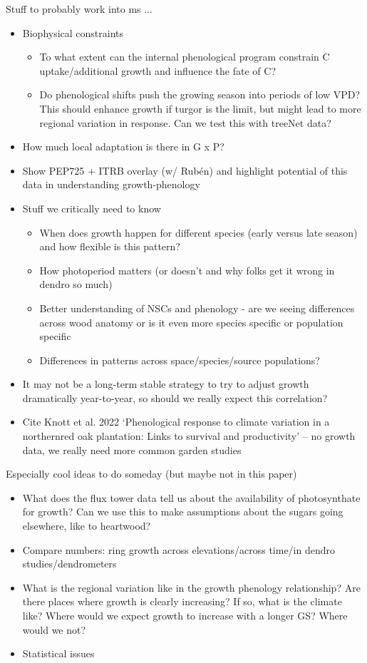 \documentclass[11pt,letter]{article}
\begin{document}
Stuff to probably work into ms ...
\begin{itemize}
\item Biophysical constraints
\begin{itemize}
\item To what extent can the internal phenological program constrain C uptake/additional growth and influence the fate of C?
\item Do phenological shifts push the growing season into periods of low VPD? This should enhance growth if turgor is the limit, but might lead to more regional variation in response. Can we test this with treeNet data?
\end{itemize}
\item How much local adaptation is there in G x P?
\item Show PEP725 + ITRB overlay (w/ Rubén) and highlight potential of this data in understanding growth-phenology
\item Stuff we critically need to know
\begin{itemize}
\item When does growth happen for different species (early versus late season) and how flexible is this pattern?
\item How photoperiod matters (or doesn't and why folks get it wrong in dendro so much)
\item Better understanding of NSCs and phenology - are we seeing differences across wood anatomy or is it even more species specific or population specific
\item Differences in patterns across space/species/source populations?
\end{itemize}
\item It may not be a long-term stable strategy to try to adjust growth dramatically year-to-year, so should we really expect this correlation?
\item Cite Knott et al. 2022 `Phenological response to climate variation in a northernred oak plantation: Links to survival and productivity' -- no growth data, we really need more common garden studies
\end{itemize}

Especially cool ideas to do someday (but maybe not in this paper)
\begin{itemize}
\item What does the flux tower data tell us about the availability of photosynthate for growth? Can we use this to make assumptions about the sugars going elsewhere, like to heartwood?
\item Compare numbers: ring growth across elevations/across time/in dendro studies/dendrometers
\item What is the regional variation like in the growth phenology relationship? Are there places where growth is clearly increasing? If so, what is the climate like? Where would we expect growth to increase with a longer GS? Where would we not?
\item Statistical issues
\end{itemize}
\end{document}
